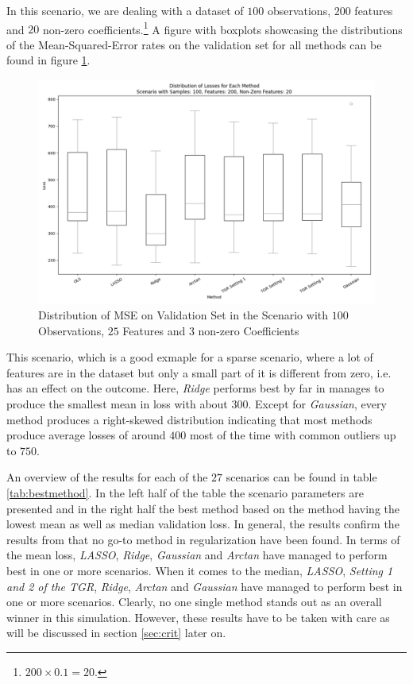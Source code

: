 \documentclass[12pt,a4paper]{article}
\begin{document}
In this scenario, we are dealing with a dataset of $100$ observations, $200$ features and $20$ non-zero coefficients.\footnote{$200 \times 0.1 = 20$.} A figure with boxplots showcasing the distributions of the Mean-Squared-Error rates on the validation set for all methods can be found in figure \ref{fig:SpecificScenario}.

\begin{figure}[h!]
\centering
\includegraphics[scale=0.5]{../02_simulation/021_simulation_figures/Scenarion_100_200_20.png}
\caption{Distribution of MSE on Validation Set in the Scenario with $100$ Observations, $25$ Features and $3$ non-zero Coefficients}
\label{fig:SpecificScenario}
\end{figure} 	

This scenario, which is a good exmaple for a sparse scenario, where a lot of features are in the dataset but only a small part of it is different from zero, i.e. has an effect on the outcome. Here, \textit{Ridge} performs best by far in manages to produce the smallest mean in loss with about $300$. Except for \textit{Gaussian}, every method produces a right-skewed distribution indicating that most methods produce average losses of around $400$ most of the time with common outliers up to $750$.  

An overview of the results for each of the $27$ scenarios can be found in table \ref{tab:bestmethod}. In the left half of the table the scenario parameters are presented and in the right half the best method based on the method having the lowest mean as well as median validation loss. In general, the results confirm the results from \textcite{WangEtAl2020} that no go-to method in regularization have been found. In terms of the mean loss, \textit{LASSO}, \textit{Ridge}, \textit{Gaussian} and \textit{Arctan} have managed to perform best in one or more scenarios. When it comes to the median, \textit{LASSO}, \textit{Setting 1 and 2 of the TGR}, \textit{Ridge}, \textit{Arctan} and \textit{Gaussian} have managed to perform best in one or more scenarios. Clearly, no one single method stands out as an overall winner in this simulation. However, these results have to be taken with care as will be discussed in section \ref{sec:crit} later on. 
\end{document}
